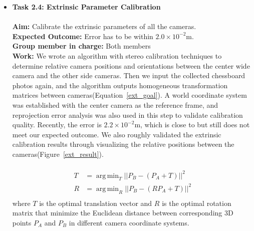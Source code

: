 \documentclass[11pt]{article}
\DeclareMathOperator*{\argmin}{arg\,min}
\begin{document}
\begin{itemize}
            \item \textbf{Task 2.4: Extrinsic Parameter Calibration}\\\\
            \textbf{Aim:} Calibrate the extrinsic parameters of all the cameras.\\
            \textbf{Expected Outcome:} Error has to be within $2.0\times10^{-2}$m.\\
            \textbf{Group member in charge:} Both members\\
            \textbf{Work:} We wrote an algorithm with stereo calibration techniques to determine relative camera positions and orientations between the center wide camera and the other side cameras. Then we input the collected chessboard photos again, and the algorithm outputs homogeneous transformation matrices between cameras(Equation~\ref{ext_goal}). A world coordinate system was established with the center camera as the reference frame, and reprojection error analysis was also used in this step to validate calibration quality. Recently, the error is $2.2\times10^{-2}$m, which is close to but still does not meet our expected outcome. We also roughly validated the extrinsic calibration results through visualizing the relative positions between the cameras(Figure~\ref{ext_result}).\\\\
            \begin{equation}
            \begin{aligned}
                T &= \argmin_T||P_B - (P_A + T)||^2\\
                R & = \argmin_R||P_B - (RP_A + T)||^2\\
            \end{aligned}
            \label{ext_goal}
            \end{equation}
            where $T$ is the optimal translation vector and $R$ is the optimal rotation matrix that minimize the Euclidean distance between corresponding 3D points $P_A$ and $P_B$ in different camera coordinate systems.


\end{itemize}
\end{document}
